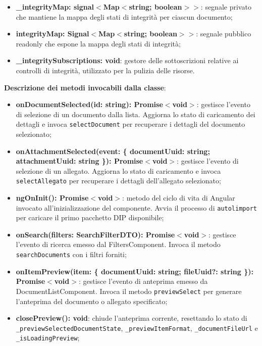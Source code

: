\documentclass[a4paper,12pt]{article}
\begin{document}
{{{{\begin{itemize}
                    \item \textbf{\_integrityMap: signal$<$Map$<$string; boolean$>$$>$}: segnale privato che mantiene la mappa degli stati di integrità per ciascun documento;
                    \item \textbf{integrityMap: Signal$<$Map$<$string; boolean$>$$>$}: segnale pubblico readonly che espone la mappa degli stati di integrità;
                    \item \textbf{\_integritySubscriptions: void}: gestore delle sottoscrizioni relative ai controlli di integrità, utilizzato per la pulizia delle risorse.
                \end{itemize}
                
                \noindent \textbf{Descrizione dei metodi invocabili dalla classe}:
                \begin{itemize}
                    \item \textbf{onDocumentSelected(id: string): Promise$<$void$>$}: gestisce l'evento di selezione di un documento dalla lista. Aggiorna lo stato di caricamento dei dettagli e invoca \texttt{selectDocument} per recuperare i dettagli del documento selezionato;
                    \item \textbf{onAttachmentSelected(event: \{ documentUuid: string; attachmentUuid: string \}): Promise$<$void$>$}: gestisce l'evento di selezione di un allegato. Aggiorna lo stato di caricamento e invoca \texttt{selectAllegato} per recuperare i dettagli dell'allegato selezionato;
                    \item \textbf{ngOnInit(): Promise$<$void$>$}: metodo del ciclo di vita di Angular invocato all'inizializzazione del componente. Avvia il processo di \texttt{autolimport} per caricare il primo pacchetto DIP disponibile;
                    \item \textbf{onSearch(filters: SearchFilterDTO): Promise$<$void$>$}: gestisce l'evento di ricerca emesso dal FiltersComponent. Invoca il metodo \texttt{searchDocuments} con i filtri forniti;
                    \item \textbf{onItemPreview(item: \{ documentUuid: string; fileUuid?: string \}): Promise$<$void$>$}: gestisce l'evento di anteprima emesso da DocumentListComponent. Invoca il metodo \texttt{previewSelect} per generare l'anteprima del documento o allegato specificato;
                    \item \textbf{closePreview(): void}: chiude l'anteprima corrente, resettando lo stato di \\ \texttt{\_previewSelectedDocumentState}, \texttt{\_previewItemFormat}, \texttt{\_documentFileUrl} e \\ \texttt{\_isLoadingPreview};

\end{itemize}}}}}
\end{document}
